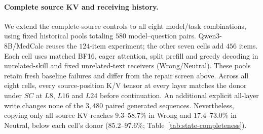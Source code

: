 \paragraph{Complete source KV and receiving history.}
We extend the complete-source controls to all eight model/task combinations,
using fixed historical pools totaling $580$ model--question pairs.
Qwen3-8B/MedCalc reuses the $124$-item experiment; the other seven cells
add $456$ items. Each cell uses matched BF16, eager attention, split prefill
and greedy decoding in unrelated-skill and fixed unrelated-text receivers
(Wrong/Neutral). These pools retain fresh baseline failures and differ
from the repair screen above.
Across all eight cells, every source-position K/V tensor at every layer
matches the donor under $SC$ at $L8$, $L16$ and $L24$ before continuation.
An additional explicit all-layer write changes none of the $3{,}480$
paired generated sequences. Nevertheless, copying only all source KV
reaches $9.3$--$58.7\%$ in Wrong and $17.4$--$73.0\%$ in Neutral,
below each cell's donor ($85.2$--$97.6\%$; Table~\ref{tab:state-completeness}).

